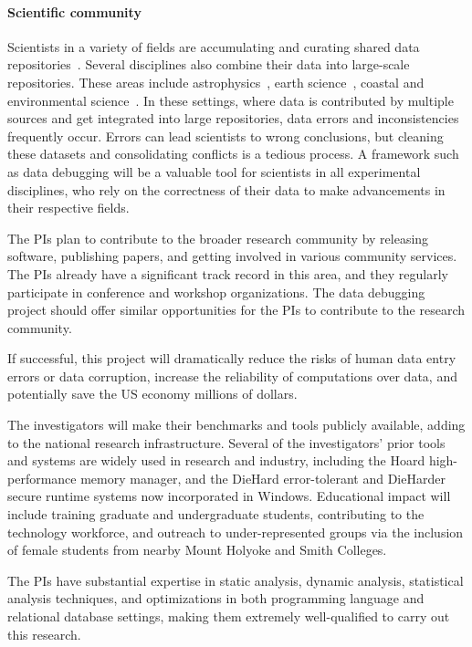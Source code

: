 \paragraph{Scientific community} %
\label{par:scientific}
Scientists in a variety of fields are accumulating and curating shared data repositories~\cite{uniprot,naturemap}. Several disciplines also combine their data into large-scale repositories. These areas include astrophysics~\cite{skysurvey}, earth science~\cite{iris,unavco}, coastal and environmental science~\cite{wagda}. In these settings, where data is contributed by multiple sources and get integrated into large repositories, data errors and inconsistencies frequently occur. Errors can lead scientists to wrong conclusions, but cleaning these datasets and consolidating conflicts is a tedious process. A framework such as data debugging will be a valuable tool for scientists in all experimental disciplines, who rely on the correctness of their data to make advancements in their respective fields.


The PIs plan to contribute to the broader research community by releasing software, publishing papers, and getting involved in various community services. The PIs already have a significant track record in this area, and they regularly participate in conference and workshop organizations. The data debugging project should offer similar opportunities for the PIs to contribute to the research community.

 If successful, this project will dramatically
reduce the risks of human data entry errors or data corruption,
increase the reliability of computations over data, and potentially
save the US economy millions of dollars.

The investigators will make their benchmarks and tools publicly
available, adding to the national research infrastructure. Several of
the investigators' prior tools and systems are widely used in research
and industry, including the Hoard high-performance memory manager, and the
DieHard error-tolerant and DieHarder secure runtime systems now
incorporated in Windows. Educational impact will include training
graduate and undergraduate students, contributing to the technology
workforce, and outreach to under-represented groups via the inclusion
of female students from nearby Mount Holyoke and Smith Colleges.

The PIs have substantial expertise in static analysis, dynamic
analysis, statistical analysis techniques, and optimizations in both
programming language and relational database settings, making them
extremely well-qualified to carry out this research.

